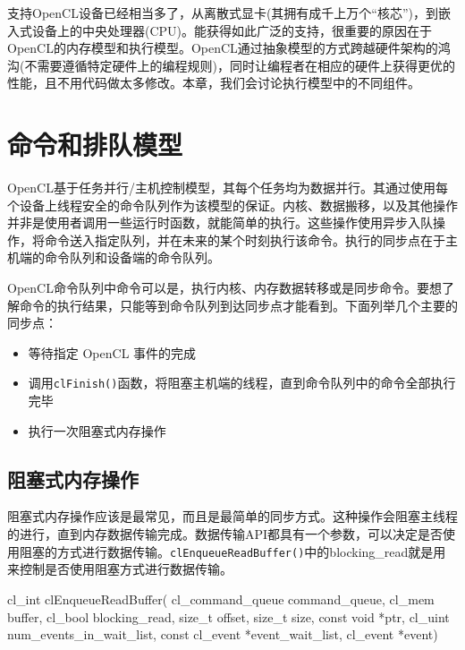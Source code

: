 
支持OpenCL设备已经相当多了，从离散式显卡(其拥有成千上万个“核芯”)，到嵌入式设备上的中央处理器(CPU)。能获得如此广泛的支持，很重要的原因在于OpenCL的内存模型和执行模型。OpenCL通过抽象模型的方式跨越硬件架构的鸿沟(不需要遵循特定硬件上的编程规则)，同时让编程者在相应的硬件上获得更优的性能，且不用代码做太多修改。本章，我们会讨论执行模型中的不同组件。


\section{命令和排队模型}

OpenCL基于任务并行/主机控制模型，其每个任务均为数据并行。其通过使用每个设备上线程安全的命令队列作为该模型的保证。内核、数据搬移，以及其他操作并非是使用者调用一些运行时函数，就能简单的执行。这些操作使用异步入队操作，将命令送入指定队列，并在未来的某个时刻执行该命令。执行的同步点在于主机端的命令队列和设备端的命令队列。

OpenCL命令队列中命令可以是，执行内核、内存数据转移或是同步命令。要想了解命令的执行结果，只能等到命令队列到达同步点才能看到。下面列举几个主要的同步点：

\begin{itemize}
\item 等待指定 OpenCL 事件的完成
\item 调用\texttt{clFinish()}函数，将阻塞主机端的线程，直到命令队列中的命令全部执行完毕
\item 执行一次阻塞式内存操作
\end{itemize}

\subsection{阻塞式内存操作}

阻塞式内存操作应该是最常见，而且是最简单的同步方式。这种操作会阻塞主线程的进行，直到内存数据传输完成。数据传输API都具有一个参数，可以决定是否使用阻塞的方式进行数据传输。\texttt{clEnqueueReadBuffer()}中的blocking\_\allowbreak{}read就是用来控制是否使用阻塞方式进行数据传输。

\begin{codebox}[cpp]
cl_int
clEnqueueReadBuffer(
  cl_command_queue command_queue,
  cl_mem buffer,
  cl_bool blocking_read,
  size_t offset,
  size_t size,
  const void *ptr,
  cl_uint num_events_in_wait_list,
  const cl_event *event_wait_list,
  cl_event *event)
\end{codebox}

